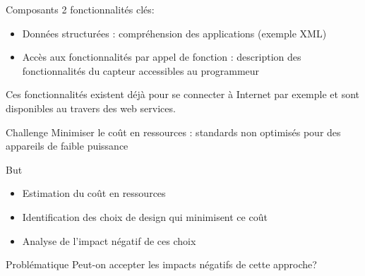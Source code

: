 \begin{frame}{Composants}
2 fonctionnalités clés:
\begin{itemize}
\item Données structurées : compréhension des applications (exemple XML)
\item Accès aux fonctionnalités par appel de fonction : description des fonctionnalités du capteur accessibles au programmeur
\end{itemize}
Ces fonctionnalités existent déjà pour se connecter à Internet par exemple et sont disponibles au travers des web services.\\ 
\begin{block}{Challenge}
Minimiser le coût en ressources : standards non optimisés pour des appareils de faible puissance
\end{block}
\end{frame}

\begin{frame}{But}
\begin{itemize}
\item Estimation du coût en ressources
\item Identification des choix de design qui minimisent ce coût
\item Analyse de l'impact négatif de ces choix 
\end{itemize}
\begin{block}{Problématique}
Peut-on accepter les impacts négatifs de cette approche?
\end{block}
\end{frame}

